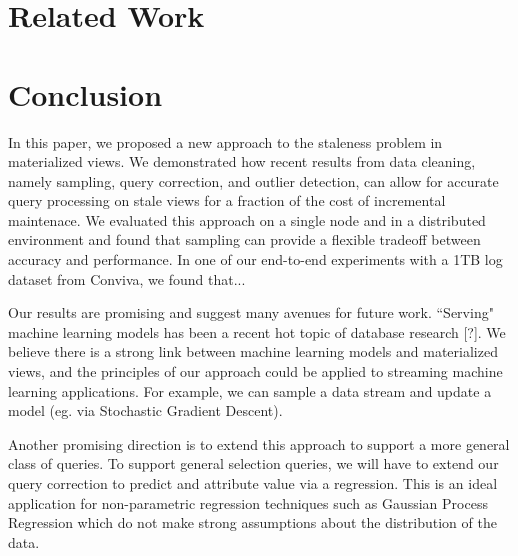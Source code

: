 \section{Related Work}
\section{Conclusion}
In this paper, we proposed a new approach to the staleness problem in materialized views.
We demonstrated how recent results from data cleaning, namely sampling, query correction, and outlier detection, can
allow for accurate query processing on stale views for a fraction of the cost of incremental maintenace.
We evaluated this approach on a single node and in a distributed environment and found that sampling can provide a flexible tradeoff 
between accuracy and performance.
In one of our end-to-end experiments with a 1TB log dataset from Conviva, we found that...

Our results are promising and suggest many avenues for future work.
``Serving" machine learning models has been a recent hot topic of database research [?].
We believe there is a strong link between machine learning models and materialized views, and the principles of our approach could be applied
to streaming machine learning applications.
For example, we can sample a data stream and update a model (eg. via Stochastic Gradient Descent).

Another promising direction is to extend this approach to support a more general class of queries.
To support general selection queries, we will have to extend our query correction to predict and attribute value via a regression.
This is an ideal application for non-parametric regression techniques such as Gaussian Process Regression which do
not make strong assumptions about the distribution of the data.


